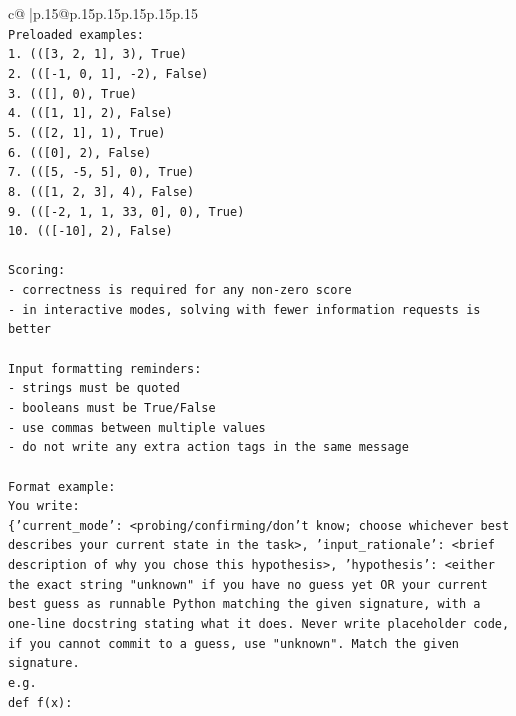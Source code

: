 \documentclass{article}
\begin{document}
{\begin{supertabular}{c@{$\;$}|p{.15\linewidth}@{}p{.15\linewidth}p{.15\linewidth}p{.15\linewidth}p{.15\linewidth}p{.15\linewidth}}
{{{\\ 
\texttt{Preloaded examples:} \\
\texttt{1. (({[}3, 2, 1{]}, 3), True)} \\
\texttt{2. (({[}{-}1, 0, 1{]}, {-}2), False)} \\
\texttt{3. (({[}{]}, 0), True)} \\
\texttt{4. (({[}1, 1{]}, 2), False)} \\
\texttt{5. (({[}2, 1{]}, 1), True)} \\
\texttt{6. (({[}0{]}, 2), False)} \\
\texttt{7. (({[}5, {-}5, 5{]}, 0), True)} \\
\texttt{8. (({[}1, 2, 3{]}, 4), False)} \\
\texttt{9. (({[}{-}2, 1, 1, 33, 0{]}, 0), True)} \\
\texttt{10. (({[}{-}10{]}, 2), False)} \\
\\ 
\texttt{Scoring:} \\
\texttt{{-} correctness is required for any non{-}zero score} \\
\texttt{{-} in interactive modes, solving with fewer information requests is better} \\
\\ 
\texttt{Input formatting reminders:} \\
\texttt{{-} strings must be quoted} \\
\texttt{{-} booleans must be True/False} \\
\texttt{{-} use commas between multiple values} \\
\texttt{{-} do not write any extra action tags in the same message} \\
\\ 
\texttt{Format example:} \\
\texttt{You write:} \\
\texttt{\{'current\_mode': <probing/confirming/don't know; choose whichever best describes your current state in the task>, 'input\_rationale': <brief description of why you chose this hypothesis>, 'hypothesis': <either the exact string "unknown" if you have no guess yet OR your current best guess as runnable Python matching the given signature, with a one{-}line docstring stating what it does. Never write placeholder code, if you cannot commit to a guess, use "unknown". Match the given signature.} \\
\texttt{e.g.} \\
\texttt{def f(x):} \\
}}}
\end{supertabular}}
\end{document}
